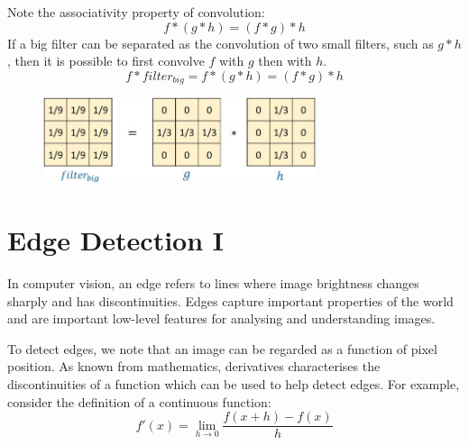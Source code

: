 \documentclass{report}
\begin{document}
Note the associativity property of convolution:
$$
    f*(g*h) = (f*g)*h
$$
If a big filter can be separated as the convolution of two small filters, such
as $g*h$, then it is possible to first convolve $f$ with $g$ then with $h$.
$$
    f*filter_{big} = f*(g*h) = (f*g)*h
$$
\begin{figure}[h]
    \centering
    \includegraphics[width=8cm]{Associativity and separable.JPG}
\end{figure}

\chapter{Edge Detection I}

In computer vision, an edge refers to lines where image brightness changes
sharply and has discontinuities. Edges capture important properties of the world
and are important low-level features for analysing and understanding images.

To detect edges, we note that an image can be regarded as a function of pixel
position. As known from mathematics, derivatives characterises the
discontinuities of a function which can be used to help detect edges. For
example, consider the definition of a continuous function:
$$
    f'(x) = \lim_{h \rightarrow 0} \frac{f(x+h) - f(x)}{h}
$$
\begin{figure}[h]
    \centering
    \qquad
\end{figure}
 
\end{document}
